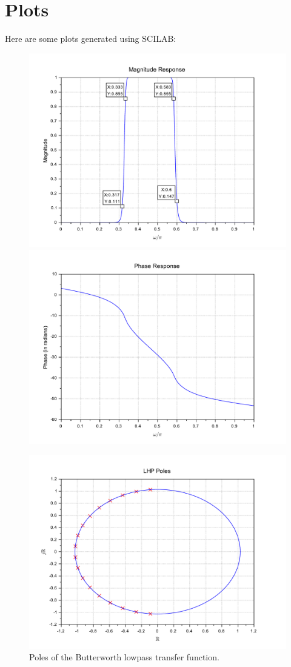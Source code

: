 \documentclass[12pt]{article}
\begin{document}
\section{Plots}
Here are some plots generated using SCILAB:
\newpage
\begin{figure}[!h]
    \centering
    \includegraphics[scale=0.6]{mag.pdf}
    \quad
    \includegraphics[scale=0.6]{phase.pdf}
\end{figure}
\begin{figure}[!h]
    \centering
    \includegraphics[scale=0.6]{poles.pdf}
    \caption{Poles of the Butterworth lowpass transfer function.}
\end{figure}
\end{document}
